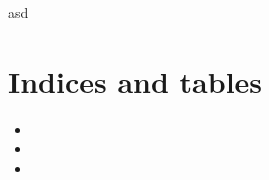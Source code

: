 \documentclass[letterpaper,10pt,english]{sphinxmanual}
\begin{document}
asd


\chapter{Indices and tables}
\label{index:indices-and-tables}\begin{itemize}
\item {} 

\item {} 

\item {} 

\end{itemize}



\renewcommand{\indexname}{Index}
\printindex
\end{document}
